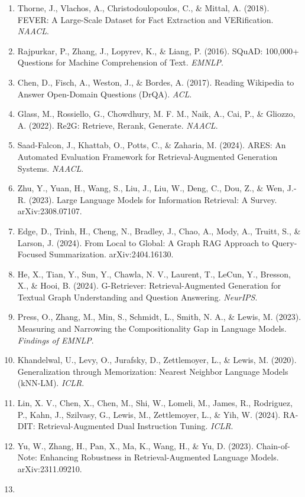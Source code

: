 \begin{enumerate}
\item
  Thorne, J., Vlachos, A., Christodoulopoulos, C., \& Mittal, A. (2018). FEVER: A Large-Scale Dataset for Fact Extraction and VERification. \emph{NAACL}.
\item
  Rajpurkar, P., Zhang, J., Lopyrev, K., \& Liang, P. (2016). SQuAD: 100,000+ Questions for Machine Comprehension of Text. \emph{EMNLP}.
\item
  Chen, D., Fisch, A., Weston, J., \& Bordes, A. (2017). Reading Wikipedia to Answer Open-Domain Questions (DrQA). \emph{ACL}.
\item
  Glass, M., Rossiello, G., Chowdhury, M. F. M., Naik, A., Cai, P., \& Gliozzo, A. (2022). Re2G: Retrieve, Rerank, Generate. \emph{NAACL}.
\item
  Saad-Falcon, J., Khattab, O., Potts, C., \& Zaharia, M. (2024). ARES: An Automated Evaluation Framework for Retrieval-Augmented Generation Systems. \emph{NAACL}.
\item
  Zhu, Y., Yuan, H., Wang, S., Liu, J., Liu, W., Deng, C., Dou, Z., \& Wen, J.-R. (2023). Large Language Models for Information Retrieval: A Survey. arXiv:2308.07107.
\item
  Edge, D., Trinh, H., Cheng, N., Bradley, J., Chao, A., Mody, A., Truitt, S., \& Larson, J. (2024). From Local to Global: A Graph RAG Approach to Query-Focused Summarization. arXiv:2404.16130.
\item
  He, X., Tian, Y., Sun, Y., Chawla, N. V., Laurent, T., LeCun, Y., Bresson, X., \& Hooi, B. (2024). G-Retriever: Retrieval-Augmented Generation for Textual Graph Understanding and Question Answering. \emph{NeurIPS}.
\item
  Press, O., Zhang, M., Min, S., Schmidt, L., Smith, N. A., \& Lewis, M. (2023). Measuring and Narrowing the Compositionality Gap in Language Models. \emph{Findings of EMNLP}.
\item
  Khandelwal, U., Levy, O., Jurafsky, D., Zettlemoyer, L., \& Lewis, M. (2020). Generalization through Memorization: Nearest Neighbor Language Models (kNN-LM). \emph{ICLR}.
\item
  Lin, X. V., Chen, X., Chen, M., Shi, W., Lomeli, M., James, R., Rodriguez, P., Kahn, J., Szilvasy, G., Lewis, M., Zettlemoyer, L., \& Yih, W. (2024). RA-DIT: Retrieval-Augmented Dual Instruction Tuning. \emph{ICLR}.
\item
  Yu, W., Zhang, H., Pan, X., Ma, K., Wang, H., \& Yu, D. (2023). Chain-of-Note: Enhancing Robustness in Retrieval-Augmented Language Models. arXiv:2311.09210.
\item

\end{enumerate}

